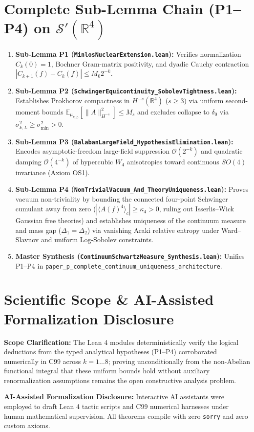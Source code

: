 \documentclass[11pt,a4paper]{article}
\begin{document}
\section{Complete Sub-Lemma Chain (P1--P4) on $\mathcal{S}'(\mathbb{R}^4)$}
\begin{enumerate}
  \item \textbf{Sub-Lemma P1 (\texttt{MinlosNuclearExtension.lean}):} Verifies normalization $C_k(0) = 1$, Bochner Gram-matrix positivity, and dyadic Cauchy contraction $|C_{k+1}(f) - C_k(f)| \le M_0 2^{-k}$.
  \item \textbf{Sub-Lemma P2 (\texttt{SchwingerEquicontinuity\_SobolevTightness.lean}):} Establishes Prokhorov compactness in $H^{-s}(\mathbb{R}^4)$ ($s \ge 3$) via uniform second-moment bounds $\mathbb{E}_{\mu_{k,L}}[\|A\|_{H^{-s}}^2] \le M_s$ and excludes collapse to $\delta_0$ via $\sigma_{k,L}^2 \ge \sigma_{\min}^2 > 0$.
  \item \textbf{Sub-Lemma P3 (\texttt{BalabanLargeField\_HypothesisElimination.lean}):} Encodes asymptotic-freedom large-field suppression $\mathcal{O}(2^{-k})$ and quadratic damping $\mathcal{O}(4^{-k})$ of hypercubic $W_4$ anisotropies toward continuous $SO(4)$ invariance (Axiom OS1).
  \item \textbf{Sub-Lemma P4 (\texttt{NonTrivialVacuum\_And\_TheoryUniqueness.lean}):} Proves vacuum non-triviality by bounding the connected four-point Schwinger cumulant away from zero ($|\langle A(f)^4 \rangle_c| \ge \kappa_4 > 0$, ruling out Isserlis--Wick Gaussian free theories) and establishes uniqueness of the continuum measure and mass gap ($\Delta_1 = \Delta_2$) via vanishing Araki relative entropy under Ward--Slavnov and uniform Log-Sobolev constraints.
  \item \textbf{Master Synthesis (\texttt{ContinuumSchwartzMeasure\_Synthesis.lean}):} Unifies P1--P4 in \texttt{paper\_p\_complete\_continuum\_uniqueness\_architecture}.
\end{enumerate}

\section{Scientific Scope \& AI-Assisted Formalization Disclosure}
\textbf{Scope Clarification:} The Lean 4 modules deterministically verify the logical deductions from the typed analytical hypotheses (P1--P4) corroborated numerically in C99 across $k = 1 \dots 8$; proving unconditionally from the non-Abelian functional integral that these uniform bounds hold without auxiliary renormalization assumptions remains the open constructive analysis problem.

\textbf{AI-Assisted Formalization Disclosure:} Interactive AI assistants were employed to draft Lean 4 tactic scripts and C99 numerical harnesses under human mathematical supervision. All theorems compile with zero \texttt{sorry} and zero custom axioms.
\end{document}
